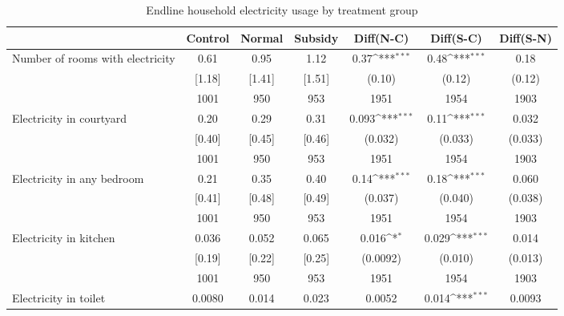 \begin{table}[htbp]\centering
\def\sym#1{\ifmmode^{#1}\else\(^{#1}\)\fi}
\caption{Endline household electricity usage by treatment group \label{tab:"balance"}}
\begin{tabular*}{1\hsize}{@{\hskip\tabcolsep\extracolsep\fill}l*{1}{cccccc}}
\toprule
                                &  Control&   Normal&  Subsidy&Diff(N-C)         &Diff(S-C)         &Diff(S-N)         \\
\midrule
Number of rooms with electricity&     0.61&     0.95&     1.12&     0.37\sym{***}&     0.48\sym{***}&     0.18         \\
                                &   [1.18]&   [1.41]&   [1.51]&   (0.10)         &   (0.12)         &   (0.12)         \\
                                &     1001&      950&      953&     1951         &     1954         &     1903         \\
Electricity in courtyard        &     0.20&     0.29&     0.31&    0.093\sym{***}&     0.11\sym{***}&    0.032         \\
                                &   [0.40]&   [0.45]&   [0.46]&  (0.032)         &  (0.033)         &  (0.033)         \\
                                &     1001&      950&      953&     1951         &     1954         &     1903         \\
Electricity in any bedroom      &     0.21&     0.35&     0.40&     0.14\sym{***}&     0.18\sym{***}&    0.060         \\
                                &   [0.41]&   [0.48]&   [0.49]&  (0.037)         &  (0.040)         &  (0.038)         \\
                                &     1001&      950&      953&     1951         &     1954         &     1903         \\
Electricity in kitchen          &    0.036&    0.052&    0.065&    0.016\sym{*}  &    0.029\sym{***}&    0.014         \\
                                &   [0.19]&   [0.22]&   [0.25]& (0.0092)         &  (0.010)         &  (0.013)         \\
                                &     1001&      950&      953&     1951         &     1954         &     1903         \\
Electricity in toilet           &   0.0080&    0.014&    0.023&   0.0052         &    0.014\sym{***}&   0.0093         \\

\end{tabular*}
\end{table}
